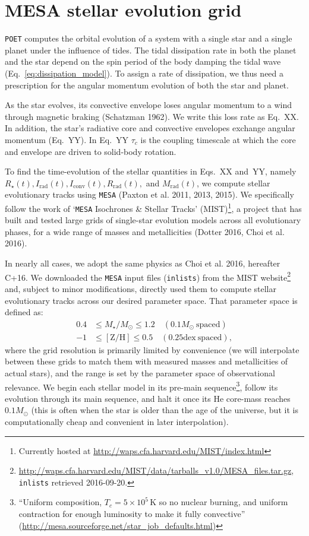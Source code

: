 \documentclass{article}
\begin{document}
\section{MESA stellar evolution grid}	
\label{sec:MESA}
\texttt{POET} computes the orbital evolution of a system with a single star and 
a single planet under the influence of tides.
The tidal dissipation rate in both the planet and the star depend on the
spin period of the body damping the tidal wave 
(Eq.~\protect\ref{eq:dissipation_model}).
To assign a rate of dissipation, we thus need a prescription for the angular 
momentum evolution of both the star and planet.

As the star evolves, its convective envelope loses angular momentum to 
a wind through magnetic braking (Schatzman 1962). We write this loss rate as 
Eq.~XX. In addition, the star's radiative core and convective envelopes 
exchange angular momentum (Eq.~YY). In Eq.~YY $\tau_c$ is the coupling timescale 
at which the core and envelope are driven to solid-body rotation. 

To find the time-evolution of the stellar quantities in 
Eqs.~XX and~YY, namely 
$R_\star(t),I_\mathrm{rad}(t),I_\mathrm{conv}(t),R_\mathrm{rad}(t),$ 
and $M_\mathrm{rad}(t)$, we compute stellar evolutionary tracks using 
\texttt{MESA} (Paxton et al. 2011, 2013, 2015).
We specifically follow the work of `\texttt{MESA} Isochrones \& Stellar Tracks' 
(MIST)\footnote{Currently hosted at 
\url{http://waps.cfa.harvard.edu/MIST/index.html}}, a project 
that has built and tested large grids of single-star 
evolution models across all evolutionary phases, for a wide range of masses and 
metallicities (Dotter 2016, Choi et al. 2016).

In nearly all cases, we adopt the same physics as Choi et al. 2016, hereafter 
C+16.
We downloaded the \texttt{MESA} input files (\texttt{inlists}) from the MIST 
website\footnote{\url{http://waps.cfa.harvard.edu/MIST/data/tarballs_v1.0/MESA_files.tar.gz},
\texttt{inlists} retrieved 2016-09-20.} and, subject to minor modifications, 
directly used them to compute stellar evolutionary tracks 
across our desired parameter space.
That parameter space is defined as:
\begin{align}
0.4 &\leq M_\star / M_\odot \leq 1.2\quad (0.1M_\odot\ \mathrm{spaced}) \\
-1 &\leq \mathrm{[Z/H]} \leq 0.5\quad (0.25\mathrm{dex\ spaced}),
\end{align}
where the grid resolution is primarily limited by convenience (we will 
interpolate between these grids to match them with measured masses and 
metallicities of actual stars), and the range is set by the parameter space of 
observational relevance.
We begin each stellar model in its pre-main sequence\footnote{``Uniform 
composition, $T_c=5\times10^5\,\mathrm{K}$ so no nuclear burning, and uniform 
contraction for enough luminosity to make it fully convective'' 
(\url{http://mesa.sourceforge.net/star_job_defaults.html})}, follow its 
evolution
through its main sequence, and halt it once its He core-mass reaches 
$0.1M_\odot$ (this is often when the star is older than the age of the 
universe, but it is computationally cheap and convenient in later 
interpolation).
\end{document}
